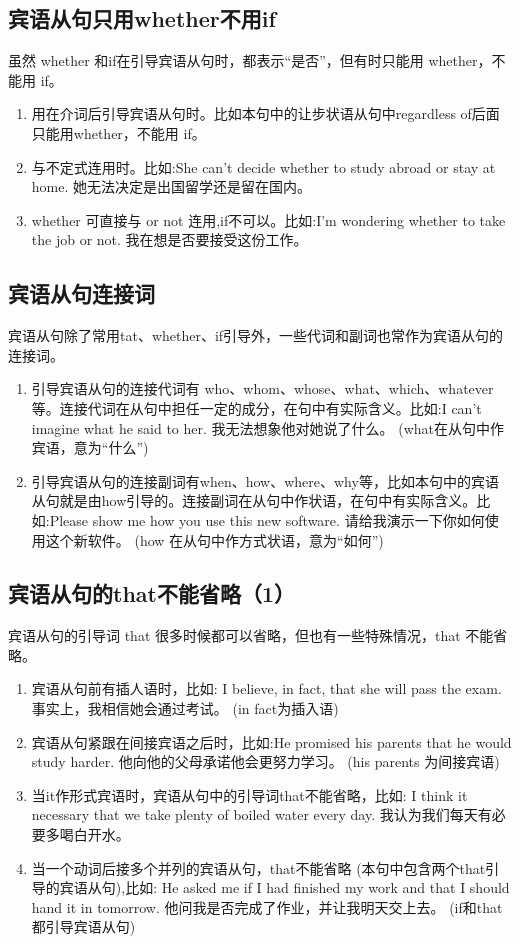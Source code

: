 \subsection{宾语从句只用whether不用if}

虽然 whether 和if在引导宾语从句时，都表示“是否”，但有时只能用 whether，不能用 if。
\begin{enumerate}
  \item 用在介词后引导宾语从句时。比如本句中的让步状语从句中regardless of后面只能用whether，不能用 if。
  \item 与不定式连用时。比如:She can't decide whether to study abroad or stay at home. 她无法决定是出国留学还是留在国内。
  \item whether 可直接与 or not 连用,if不可以。比如:I'm wondering whether to take the job or not. 我在想是否要接受这份工作。
\end{enumerate}

\subsection{宾语从句连接词}

宾语从句除了常用tat、whether、if引导外，一些代词和副词也常作为宾语从句的连接词。
\begin{enumerate}
  \item 引导宾语从句的连接代词有 who、whom、whose、what、which、whatever 等。连接代词在从句中担任一定的成分，在句中有实际含义。比如:I can't imagine what he said to her. 我无法想象他对她说了什么。 (what在从句中作宾语，意为“什么”)
  \item 引导宾语从句的连接副词有when、how、where、why等，比如本句中的宾语从句就是由how引导的。连接副词在从句中作状语，在句中有实际含义。比如:Please show me how you use this new software. 请给我演示一下你如何使用这个新软件。 (how 在从句中作方式状语，意为“如何”)
\end{enumerate}

\subsection{宾语从句的that不能省略（1）}

宾语从句的引导词 that 很多时候都可以省略，但也有一些特殊情况，that 不能省略。
\begin{enumerate}
  \item 宾语从句前有插人语时，比如: I believe, in fact, that she will pass the exam. 事实上，我相信她会通过考试。 (in fact为插入语)
  \item 宾语从句紧跟在间接宾语之后时，比如:He promised his parents that he would study harder. 他向他的父母承诺他会更努力学习。 (his parents 为间接宾语)
  \item 当it作形式宾语时，宾语从句中的引导词that不能省略，比如: I think it necessary that we take plenty of boiled water every day. 我认为我们每天有必要多喝白开水。
  \item 当一个动词后接多个并列的宾语从句，that不能省略 (本句中包含两个that引导的宾语从句),比如: He asked me if I had finished my work and that I should hand it in tomorrow. 他问我是否完成了作业，并让我明天交上去。 (if和that都引导宾语从句)
\end{enumerate}

